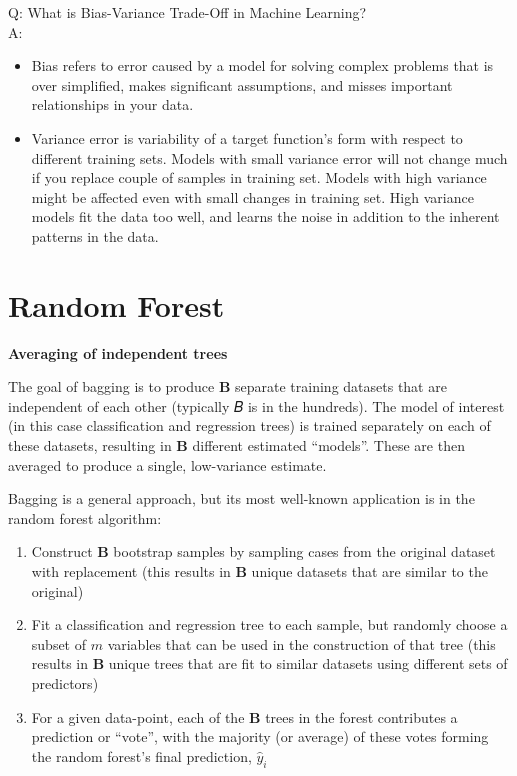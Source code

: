 \documentclass[
]{book}
\providecommand{\tightlist}{%
  \setlength{\itemsep}{0pt}\setlength{\parskip}{0pt}}
\begin{document}
Q: What is Bias-Variance Trade-Off in Machine Learning?\\
A:

\begin{itemize}
\tightlist
\item
  Bias refers to error caused by a model for solving complex problems that is over simplified, makes significant assumptions, and misses important relationships in your data.
\item
  Variance error is variability of a target function's form with respect to different training sets. Models with small variance error will not change much if you replace couple of samples in training set. Models with high variance might be affected even with small changes in training set. High variance models fit the data too well, and learns the noise in addition to the inherent patterns in the data.
\end{itemize}

\section{Random Forest}\label{random-forest}

\textbf{Averaging of independent trees}

The goal of bagging is to produce \(\boldsymbol{B}\) separate training datasets that are independent of each other (typically 𝐵 is in the hundreds). The model of interest (in this case classification and regression trees) is trained separately on each of these datasets, resulting in \(\boldsymbol{B}\) different estimated ``models''. These are then averaged to produce a single, low-variance estimate.

Bagging is a general approach, but its most well-known application is in the random forest algorithm:

\begin{enumerate}
\def\labelenumi{\arabic{enumi}.}
\tightlist
\item
  Construct \(\boldsymbol{B}\) bootstrap samples by sampling cases from the original dataset with replacement (this results in \(\boldsymbol{B}\) unique datasets that are similar to the original)
\item
  Fit a classification and regression tree to each sample, but randomly choose a subset of \(m\) variables that can be used in the construction of that tree (this results in \(\boldsymbol{B}\) unique trees that are fit to similar datasets using different sets of predictors)
\item
  For a given data-point, each of the \(\boldsymbol{B}\) trees in the forest contributes a prediction or ``vote'', with the majority (or average) of these votes forming the random forest's final prediction, \(\hat{y}_i\)
\end{enumerate}
\end{document}
